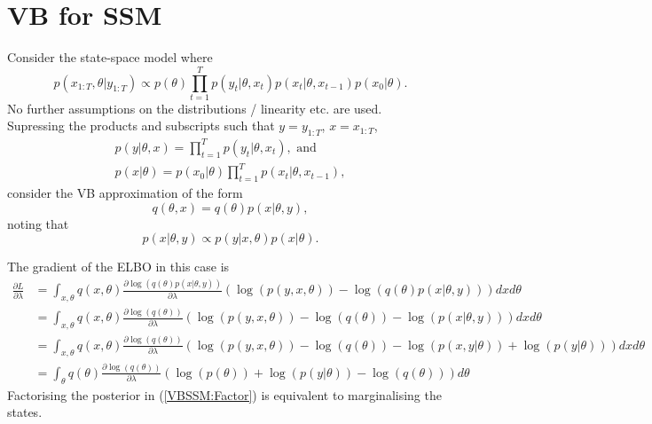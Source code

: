\documentclass[
12pt, %
onehalfspacing, %
nohyperref, %
headsepline, %
chapterinoneline, %
]{MastersDoctoralThesis} %
\begin{document}
\section{VB for SSM}

Consider the state-space model where
\begin{equation}
p(x_{1:T}, \theta | y_{1:T}) \propto p(\theta) \prod_{t=1}^T p(y_t | \theta, x_t)p(x_t | \theta, x_{t-1}) p(x_0 | \theta).
\end{equation}
No further assumptions on the distributions / linearity etc. are used.
\\

Supressing the products and subscripts such that $y = y_{1:T}$, $x = x_{1:T}$,
\begin{align}
p(y | \theta, x) = \prod_{t=1}^T p(y_t | \theta, x_t), \mbox{ and} \\
p(x | \theta) = p(x_0 | \theta) \prod_{t=1}^T p(x_t | \theta, x_{t-1}),
\end{align}
consider the VB approximation of the form
\begin{equation}
\label{VBSSM:Factor}
q(\theta, x) = q(\theta)p(x | \theta, y),
\end{equation}
noting that 
\begin{equation}
p(x | \theta, y) \propto p(y | x, \theta)p(x | \theta).
\end{equation}

The gradient of the ELBO in this case is
\begin{align}
\frac{\partial L}{\partial \lambda} &= \int_{x, \theta}q(x, \theta)\frac{\partial \log(q(\theta)p(x|\theta, y))}{\partial \lambda} \left(\log(p(y, x, \theta)) - \log(q(\theta)p(x | \theta, y)) \right) dxd\theta \\
&=  \int_{x, \theta}q(x, \theta) \frac{\partial \log(q(\theta))}{\partial \lambda} \left(\log(p(y, x, \theta)) - \log(q(\theta)) - \log(p(x | \theta, y)) \right)dxd\theta \\
&= \int_{x, \theta}q(x, \theta) \frac{\partial \log(q(\theta))}{\partial \lambda} \left(\log(p(y, x, \theta)) - \log(q(\theta)) - \log(p(x, y |\theta)) + \log(p(y | \theta)) \right)dxd\theta \\
&= \int_{\theta}q(\theta) \frac{\partial \log(q(\theta))}{\partial \lambda} \left(\log(p(\theta)) + \log(p(y | \theta)) - \log(q(\theta)) \right) d\theta
\end{align}
Factorising the posterior in (\ref{VBSSM:Factor}) is equivalent to marginalising the states.
\\
\end{document}
